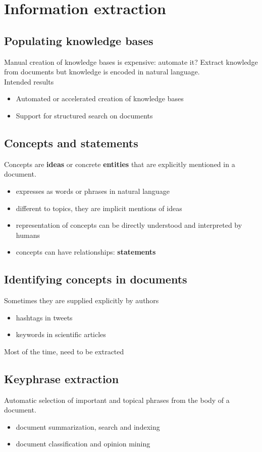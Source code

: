 \section{Information extraction}

\subsection{Populating knowledge bases}
Manual creation of knowledge bases is expensive: automate it?
Extract knowledge from documents but knowledge is encoded in natural
language. \\
Intended results
\begin{itemize}
\item Automated or accelerated creation of knowledge bases
\item Support for structured search on documents
\end{itemize}

\subsection{Concepts and statements}
Concepts are \textbf{ideas} or concrete \textbf{entities} that are
explicitly mentioned in a document.
\begin{itemize}
\item expresses as words or phrases in natural language
\item different to topics, they are implicit mentions of ideas
\item representation of concepts can be directly understood and
  interpreted by humans
\item concepts can have relationships: \textbf{statements}
\end{itemize}

\subsection{Identifying concepts in documents}
Sometimes they are supplied explicitly by authors
\begin{itemize}
\item hashtags in tweets
\item keywords in scientific articles
\end{itemize}
Most of the time, need to be extracted

\subsection{Keyphrase extraction}
Automatic selection of important and topical phrases from the body of
a document.
\begin{itemize}
\item document summarization, search and indexing
\item document classification and opinion mining
\end{itemize}

